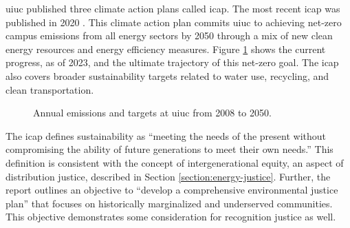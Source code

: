 \ac{uiuc} published three climate action plans called \ac{icap}. The most recent
\ac{icap} was published in 2020
\cite{institute_for_sustainability_energy_and_environment_illinois_2020}. This
climate action plan commits \ac{uiuc} to achieving net-zero campus emissions
from all energy sectors by 2050 through a mix of new clean energy resources and
energy efficiency measures. Figure \ref{fig:uiuc-emissions} shows the current
progress, as of 2023, and the ultimate trajectory of this net-zero goal. The
\ac{icap} also covers broader sustainability targets related to water use,
recycling, and clean transportation. 
\begin{figure}[ht!]
    \centering
    \resizebox{0.75\columnwidth}{!}{}
    \caption{Annual emissions and targets at \ac{uiuc} from 2008 to 2050.}
    \label{fig:uiuc-emissions}
\end{figure}
The \ac{icap} defines sustainability as ``meeting the needs of the present
without compromising the ability of future generations to meet their own
needs.'' This definition is consistent with the concept of intergenerational
equity, an aspect of distribution justice, described in Section
\ref{section:energy-justice}. Further, the report outlines an objective to
``develop a comprehensive environmental justice plan'' that focuses on
historically marginalized and underserved communities. This objective
demonstrates some consideration for recognition justice as well.


